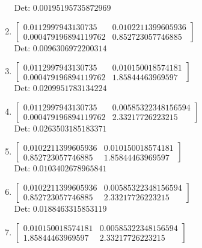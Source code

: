 \documentclass[12pt]{article}
\begin{document}
\begin{enumerate}
Det: $0.00195195735872969$\\

\item $\displaystyle \left[\begin{matrix}0.0112997943130735 & 0.0102211399605936\\0.000479196894119762 & 0.852723057746885\end{matrix}\right]$\\

Det: $0.0096306972200314$\\

\item $\displaystyle \left[\begin{matrix}0.0112997943130735 & 0.010150018574181\\0.000479196894119762 & 1.85844463969597\end{matrix}\right]$\\

Det: $0.0209951783134224$\\

\item $\displaystyle \left[\begin{matrix}0.0112997943130735 & 0.00585322348156594\\0.000479196894119762 & 2.33217726223215\end{matrix}\right]$\\

Det: $0.0263503185183371$\\

\item $\displaystyle \left[\begin{matrix}0.0102211399605936 & 0.010150018574181\\0.852723057746885 & 1.85844463969597\end{matrix}\right]$\\

Det: $0.0103402678965841$\\

\item $\displaystyle \left[\begin{matrix}0.0102211399605936 & 0.00585322348156594\\0.852723057746885 & 2.33217726223215\end{matrix}\right]$\\

Det: $0.0188463315853119$\\

\item $\displaystyle \left[\begin{matrix}0.010150018574181 & 0.00585322348156594\\1.85844463969597 & 2.33217726223215\end{matrix}\right]$\\


\end{enumerate}
\end{document}
